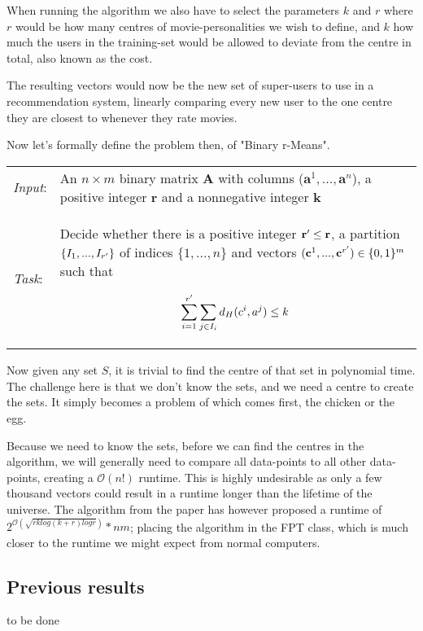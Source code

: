 \documentclass[a4paper]{article}
\begin{document}
When running the algorithm we also have to select the parameters $k$ and $r$ where $r$ would be
how many centres of movie-personalities we wish to define, and $k$ how much the users in
the training-set would be allowed to deviate from the centre in total, also known as the cost.

The resulting vectors would now be the new set of super-users to use in a recommendation system,
linearly comparing every new user to the one centre they are closest to whenever they rate movies.

Now let's formally define the problem then, of "Binary r-Means".
\begin{problem}
\begin{tabular}{p{}p{}}
    \textit{Input}: & An $n \times m$ binary matrix \textbf{A} with columns
    ($\textbf{a}^1,...,\textbf{a}^n$), a positive integer $\textbf{r}$ and a nonnegative
    integer $\textbf{k}$                                                                     \\

    \textit{Task}:  & Decide whether there is a positive integer $\textbf{r}\sp{\prime} \leq
        \textbf{r}$, a partition $\{I_1, ..., I_{r\sp{\prime}}\}$ of indices $\{1,...,n\}$ and vectors
    $(\textbf{c}^1,...,\textbf{c}^{r\sp{\prime}}) \in \{0,1\}^m$ such that

    \[
        \sum_{i = 1}^{r\sp{\prime}} \sum_{j \in I_i} d_H(c^i, a^j) \leq k
    \]
\end{tabular}
\end{problem}

Now given any set $S$, it is trivial to find the centre of that set in polynomial time. The challenge
here is that we don't know the sets, and we need a centre to create the sets. It simply becomes a problem
of which comes first, the chicken or the egg.

Because we need to know the sets, before we can find the centres in the algorithm, we will
generally need to compare all data-points to all other data-points, creating a $\mathcal{O}(n!)$ runtime. This
is highly undesirable as only a few thousand vectors could result in a runtime longer than the lifetime
of the universe. The algorithm from the paper \cite{fomin_golovach_panolan_2020} has however proposed a
runtime of $2^{\mathcal{O} (\sqrt{rk log(k+r) logr})}*nm$; placing the algorithm in the FPT class, which is
much closer to the runtime we might expect from normal computers.

\subsection{Previous results}
to be done
\end{document}
